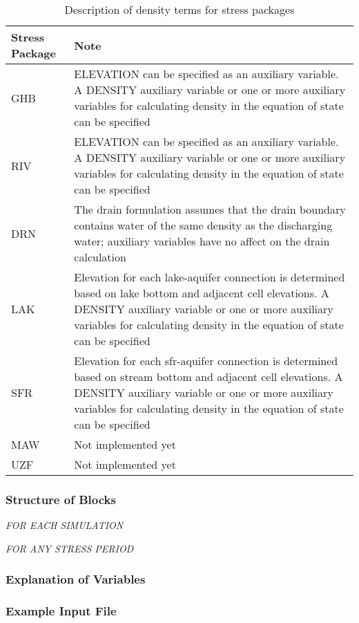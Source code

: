 \begin{longtable}{p{3cm} p{12cm}}
\caption{Description of density terms for stress packages}
\tabularnewline
\hline
\hline
\textbf{Stress Package} & \textbf{Note} \\
\hline
\endhead
\hline
\endfoot
GHB & ELEVATION can be specified as an auxiliary variable.  A DENSITY auxiliary variable or one or more auxiliary variables for calculating density in the equation of state can be specified \\
RIV & ELEVATION can be specified as an auxiliary variable.  A DENSITY auxiliary variable or one or more auxiliary variables for calculating density in the equation of state can be specified \\
DRN & The drain formulation assumes that the drain boundary contains water of the same density as the discharging water; auxiliary variables have no affect on the drain calculation  \\
LAK & Elevation for each lake-aquifer connection is determined based on lake bottom and adjacent cell elevations. A DENSITY auxiliary variable or one or more auxiliary variables for calculating density in the equation of state can be specified \\
SFR & Elevation for each sfr-aquifer connection is determined based on stream bottom and adjacent cell elevations. A DENSITY auxiliary variable or one or more auxiliary variables for calculating density in the equation of state can be specified \\
MAW & Not implemented yet \\
UZF & Not implemented yet \\
\end{longtable}

\vspace{5mm}
\subsubsection{Structure of Blocks}

\vspace{5mm}
\noindent \textit{FOR EACH SIMULATION}



\vspace{5mm}
\noindent \textit{FOR ANY STRESS PERIOD}


\vspace{5mm}
\subsubsection{Explanation of Variables}
\begin{description}

\end{description}

\vspace{5mm}
\subsubsection{Example Input File}


